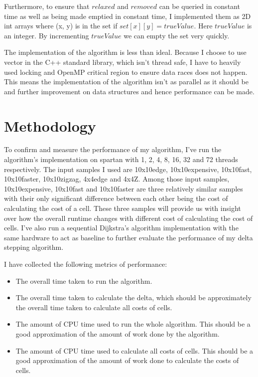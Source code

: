 \documentclass{article}
\begin{document}
Furthermore, to ensure that $relaxed$ and $removed$ can be queried in constant time as well as being
made emptied in constant time, I implemented them as 2D int arrays where (x, y) is in the set if
$set[x][y] = trueValue$. Here $trueValue$ is an integer. By incrementing $trueValue$ we can empty
the set very quickly.

The implementation of the algorithm is less than ideal. Because I choose to use vector in the C++
standard library, which isn't thread safe, I have to heavily used locking and OpenMP critical
region to ensure data races does not happen. This means the implementation of the algorithm isn't as
parallel as it should be and further improvement on data structures and hence performance can be
made.

\section*{Methodology}
To confirm and measure the performance of my algorithm, I've run the algorithm's implementation on
spartan with 1, 2, 4, 8, 16, 32 and 72 threads respectively. The input samples I used are 10x10edge,
10x10expensive, 10x10fast, 10x10faster, 10x10zigzag, 4x4edge and 4x4Z. Among those input samples,
10x10expensive, 10x10fast and 10x10faster are three relatively similar samples with their only
significant difference between each other being the cost of calculating the cost of a cell. These
three samples will provide us with insight over how the overall runtime changes with different cost
of calculating the cost of cells. I've also run a sequential Dijkstra's algorithm implementation
with the same hardware to act as baseline to further evaluate the performance of my delta stepping
algorithm.

I have collected the following metrics of performance:
\begin{itemize}
	\item The overall time taken to run the algorithm.
	\item The overall time taken to calculate the delta, which should be approximately the overall
		time taken to calculate all costs of cells.
	\item The amount of CPU time used to run the whole algorithm. This should be a good
		approximation of the amount of work done by the algorithm.
	\item The amount of CPU time used to calculate all costs of cells. This should be a good
		approximation of the amount of work done to calculate the costs of cells.
\end{itemize}
\end{document}
